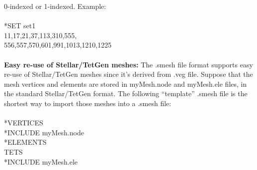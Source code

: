 \documentclass[11pt,fullpage]{article}
\begin{document}
0-indexed or 1-indexed. Example:
\\\\
\noindent{}*SET set1\\
\noindent{}11,17,21,37,113,310,555,\\
\noindent{}556,557,570,601,991,1013,1210,1225
\\\\
\noindent{}\textbf{Easy re-use of Stellar/TetGen meshes:} The .smesh file format supports
easy re-use of Stellar/TetGen meshes since it's derived from .veg
file. Suppose that the mesh vertices and elements are stored in
myMesh.node and myMesh.ele files, in the standard Stellar/TetGen
format. The following ``template'' .smesh file is the shortest way to
import those meshes into a .smesh file:
\\\\
\noindent{}*VERTICES\\
*INCLUDE myMesh.node\\
*ELEMENTS\\
TETS\\
*INCLUDE myMesh.ele



\end{document}
